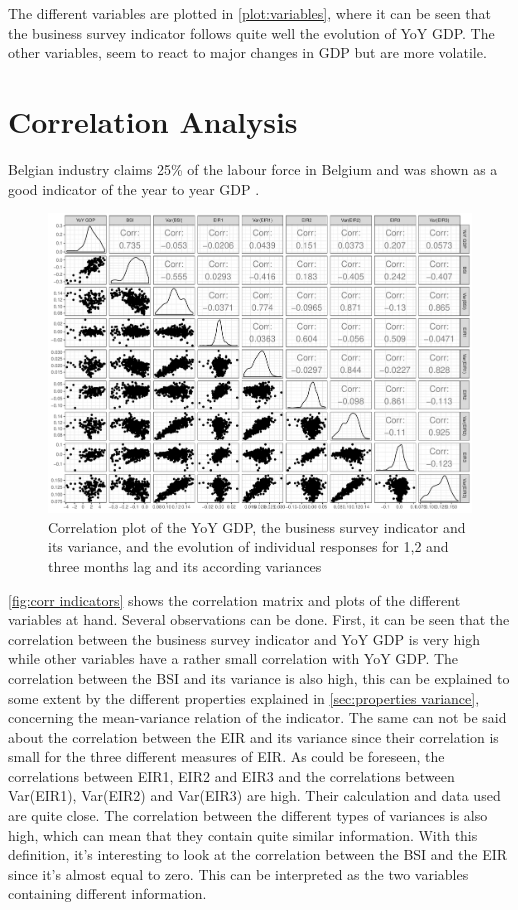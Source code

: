 \documentclass[12pt,a4paper,oneside]{book}
\begin{document}
The different variables are plotted in \autoref{plot:variables}, where it can be seen that the business survey indicator follows quite well the evolution of YoY GDP. 
The other variables, seem to react to major changes in GDP but are more volatile.


\section{Correlation Analysis}

Belgian industry claims 25\% of the labour force in Belgium and was shown as a good indicator of the year to year GDP
\citep{de_greef_national_2009}.

\begin{figure}[H]
    \centering
    \includegraphics[scale=0.5]{Graphs/corr_indicators.pdf}
    \caption{Correlation plot of the YoY GDP, the business survey indicator and its variance, and the evolution of individual responses for 1,2 and three months lag and its according variances}
    \label{fig:corr indicators}
\end{figure}

\autoref{fig:corr indicators} shows the correlation matrix and plots of the different variables at hand. 
Several observations can be done.
First, it can be seen that the correlation between the business survey indicator and YoY GDP is very high while other variables have a rather small correlation with YoY GDP.
The correlation between the BSI and its variance is also high, this can be explained to some extent by the different properties explained in \autoref{sec:properties variance}, concerning the mean-variance relation of the indicator.
The same can not be said about the correlation between the EIR and its variance since their correlation is small for the three different measures of EIR.
As could be foreseen, the correlations between EIR1, EIR2 and EIR3 and the correlations between Var(EIR1), Var(EIR2) and Var(EIR3) are high. Their calculation and data used are quite close.
The correlation between the different types of variances is also high, which can mean that they contain quite similar information.
With this definition, it's interesting to look at the correlation between the BSI and the EIR since it's almost equal to zero. This can be interpreted as the two variables containing different information.
\end{document}
